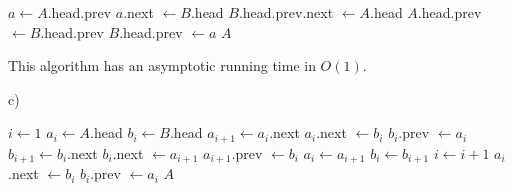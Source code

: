 \documentclass{article}
\begin{document}
\begin{algorithmic}[1]
        \State $a \gets A$.head.prev
        \State $a$.next $\gets B$.head
        \State $B$.head.prev.next $\gets A$.head
        \State $A$.head.prev $\gets B$.head.prev
        \State $B$.head.prev $\gets a$
        \State \Return $A$
    \EndFunction
\end{algorithmic}
This algorithm has an asymptotic running time in $O(1)$.

c)
\begin{algorithmic}[1]
        \State $i \gets 1$
        \State $a_i \gets A$.head
        \State $b_i \gets B$.head
            \State $a_{i+1} \gets a_i$.next
            \State $a_i$.next $\gets b_i$
            \State $b_i$.prev $\gets a_i$
            \State $b_{i+1} \gets b_i$.next
            \State $b_i$.next $\gets a_{i+1}$
            \State $a_{i+1}$.prev $\gets b_i$
            \State $a_i \gets a_{i+1}$
            \State $b_i \gets b_{i+1}$
            \State $i \gets i + 1$
        \EndWhile
        \State $a_i$.next $\gets b_i$
        \State $b_i$.prev $\gets a_i$
        \State \Return $A$
    \EndFunction
\end{algorithmic}
\end{document}
